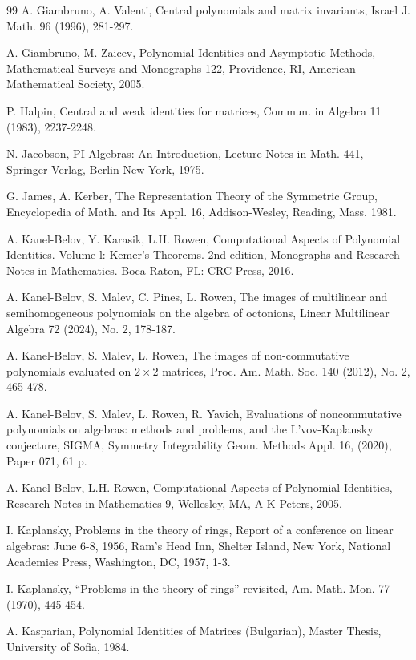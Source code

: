 \documentclass[12pt]{amsart}
\theoremstyle{definition}
\begin{document}
\begin{thebibliography}{99}
A. Giambruno, A. Valenti,
 Central polynomials and matrix invariants,
Israel J. Math. 96 (1996), 281-297.

A. Giambruno, M. Zaicev,
Polynomial Identities and Asymptotic Methods,
Mathematical Surveys and Monographs 122, Providence, RI, American Mathematical Society, 2005.

P. Halpin,
Central and weak identities for matrices,
Commun. in Algebra 11 (1983), 2237-2248.

N. Jacobson,
PI-Algebras: An Introduction,
Lecture Notes in Math. 441, Springer-Verlag, Berlin-New York, 1975.

G. James, A. Kerber,
The Representation Theory of the Symmetric Group,
Encyclopedia of Math. and Its Appl. 16, Addison-Wesley, Reading, Mass. 1981.

A. Kanel-Belov, Y. Karasik, L.H. Rowen,
Computational Aspects of Polynomial Identities. Volume l: Kemer's Theorems. 2nd edition,
Monographs and Research Notes in Mathematics. Boca Raton, FL: CRC Press, 2016.

A. Kanel-Belov, S. Malev, C. Pines, L. Rowen,
The images of multilinear and semihomogeneous polynomials on the algebra of octonions,
Linear Multilinear Algebra 72 (2024), No. 2, 178-187.

A. Kanel-Belov, S. Malev, L. Rowen,
The images of non-commutative polynomials evaluated on $2\times 2$  matrices,
Proc. Am. Math. Soc. 140 (2012), No. 2, 465-478.

A. Kanel-Belov, S. Malev, L. Rowen, R. Yavich,
Evaluations of noncommutative polynomials on algebras: methods and problems, and the L'vov-Kaplansky conjecture,
SIGMA, Symmetry Integrability Geom. Methods Appl. 16, (2020), Paper 071, 61 p.

A. Kanel-Belov, L.H. Rowen,
Computational Aspects of Polynomial Identities,
Research Notes in Mathematics 9, Wellesley, MA, A K Peters, 2005.

I. Kaplansky,
Problems in the theory of rings,
Report of a conference on linear algebras: June 6-8, 1956, Ram's Head Inn, Shelter Island, New York,
National Academies Press, Washington, DC, 1957, 1-3.

I. Kaplansky,
``Problems in the theory of rings'' revisited,
Am. Math. Mon. 77 (1970), 445-454.

A. Kasparian, Polynomial Identities of Matrices (Bulgarian),
Master Thesis, University of Sofia, 1984.


\end{thebibliography}
\end{document}
